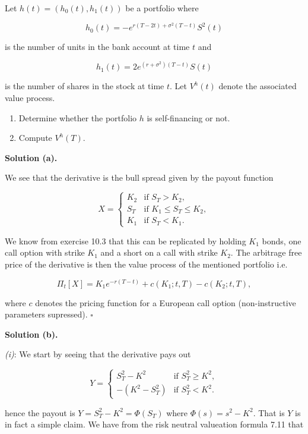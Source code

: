 \documentclass[
]{book}
\providecommand{\tightlist}{%
  \setlength{\itemsep}{0pt}\setlength{\parskip}{0pt}}
\begin{document}
Let \(h(t)=(h_0(t),h_1(t))\) be a portfolio where

\[
h_0(t)=-e^{r(T-2t)+\sigma^2(T-t)}S^2(t)
\]

is the number of units in the bank account at time \(t\) and

\[
h_1(t)=2e^{(r+\sigma^2)(T-t)}S(t)
\]

is the number of shares in the stock at time \(t\). Let \(V^h(t)\) denote the associated value process.

\begin{enumerate}
\def\labelenumi{\alph{enumi}.}
\setcounter{enumi}{2}
\tightlist
\item
  Determine whether the portfolio \(h\) is self-financing or not.
\item
  Compute \(V^h(T)\).
\end{enumerate}

\textbf{Solution (a).}

We see that the derivative is the bull spread given by the payout function

\[
X=
\begin{cases}
  K_2 & \text{if }S_T>K_2,\\
  S_T & \text{if }K_1\le S_T\le K_2,\\
  K_1 &\text{if }S_T< K_1.
\end{cases}
\]

We know from exercise 10.3 that this can be replicated by holding \(K_1\) bonds, one call option with strike \(K_1\) and a short on a call with strike \(K_2\). The arbitrage free price of the derivative is then the value process of the mentioned portfolio i.e.

\[
\Pi_t[X]=K_1 e^{-r(T-t)}+c(K_1;t,T)-c(K_2;t,T),
\]

where \(c\) denotes the pricing function for a European call option (non-instructive parameters supressed). \(\square\)

\textbf{Solution (b).}

\emph{(i)}: We start by seeing that the derivative pays out

\[
Y=
\begin{cases}
  S_T^2-K^2 & \text{if }S_T^2\ge K^2,\\
  -(K^2-S_T^2) &\text{if }S_T^2< K^2.
\end{cases}
\]

hence the payout is \(Y=S_T^2-K^2=\Phi(S_T)\) where \(\Phi(s)=s^2-K^2\). That is \(Y\) is in fact a simple claim. We have from the risk neutral valueation formula 7.11 that
\end{document}
